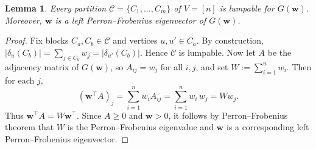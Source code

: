 \documentclass[a4paper,10pt]{amsart}
\theoremstyle{plain}
\newtheorem{lemma}[theorem]{Lemma}
\theoremstyle{definition}
\begin{document}
\begin{lemma}\label{lem:every-partition-lumpable}
Every partition $\mathcal C=\{C_1,\dots,C_m\}$ of $V=[n]$ is lumpable for $G(\mathbf w)$. Moreover, $\mathbf w$ is a left Perron--Frobenius eigenvector of $G(\mathbf w)$.
\end{lemma}
\begin{proof}
Fix blocks $C_a,C_b\in\mathcal C$ and vertices $u,u'\in C_a$. By construction, \(
|\delta_u(C_b)|=\sum_{j\in C_b} w_j=|\delta_{u'}(C_b)|\).
Hence $\mathcal C$ is lumpable. Now let $A$ be the adjacency matrix of $G(\mathbf w)$, so $A_{ij}=w_j$ for all $i,j$, and set $W:=\sum_{i=1}^n w_i$. Then for each $j$,
\[
(\mathbf w^\top A)_j=\sum_{i=1}^n w_iA_{ij}=\sum_{i=1}^n w_i\,w_j=Ww_j.
\]
Thus $\mathbf w^\top A=W\mathbf w^\top$. Since $A\ge 0$ and $\mathbf w>0$, it follows by Perron--Frobenius theorem that $W$ is the Perron--Frobenius eigenvalue and $\mathbf w$ is a corresponding left Perron--Frobenius eigenvector.
\end{proof}
\end{document}
